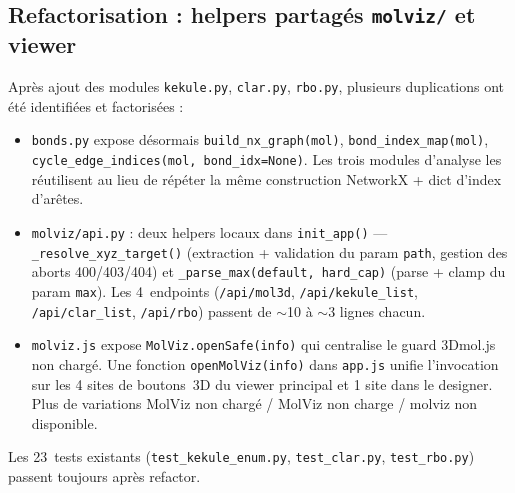 \subsection{Refactorisation : helpers partagés \texttt{molviz/} et viewer}
\label{sec:refactor-molviz-helpers}


Après ajout des modules \texttt{kekule.py}, \texttt{clar.py},
\texttt{rbo.py}, plusieurs duplications ont été identifiées et
factorisées :

\begin{itemize}
  \item \texttt{bonds.py} expose désormais \texttt{build\_nx\_graph(mol)},
    \texttt{bond\_index\_map(mol)}, \texttt{cycle\_edge\_indices(mol,
    bond\_idx=None)}. Les trois modules d'analyse les réutilisent au
    lieu de répéter la même construction NetworkX + dict
    d'index d'arêtes.
  \item \texttt{molviz/api.py} : deux helpers locaux dans
    \texttt{init\_app()} --- \texttt{\_resolve\_xyz\_target()}
    (extraction + validation du param \texttt{path}, gestion des
    aborts 400/403/404) et \texttt{\_parse\_max(default, hard\_cap)}
    (parse + clamp du param \texttt{max}). Les 4~endpoints
    (\texttt{/api/mol3d}, \texttt{/api/kekule\_list},
    \texttt{/api/clar\_list}, \texttt{/api/rbo}) passent de
    $\sim$10 à $\sim$3 lignes chacun.
  \item \texttt{molviz.js} expose \texttt{MolViz.openSafe(info)} qui
    centralise le guard \og{}3Dmol.js non chargé\fg{}. Une fonction
    \texttt{openMolViz(info)} dans \texttt{app.js} unifie l'invocation
    sur les 4 sites de boutons~3D du viewer principal et 1 site dans le
    designer. Plus de variations \og{}MolViz non chargé\fg{} /
    \og{}MolViz non charge\fg{} / \og{}molviz non disponible\fg{}.
\end{itemize}

Les 23~tests existants (\texttt{test\_kekule\_enum.py},
\texttt{test\_clar.py}, \texttt{test\_rbo.py}) passent toujours
après refactor.

